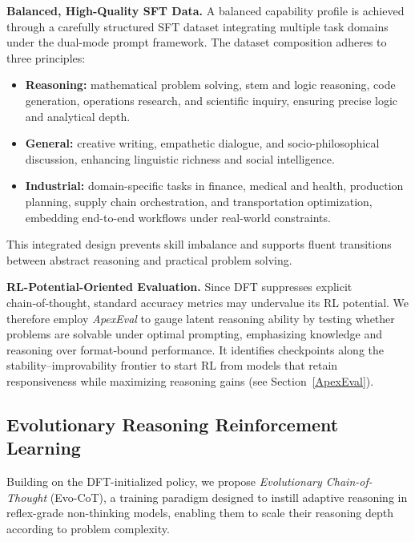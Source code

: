 \textbf{Balanced, High-Quality SFT Data.}
A balanced capability profile is achieved through a carefully structured SFT dataset integrating multiple task domains under the dual-mode prompt framework. The dataset composition adheres to three principles:
\begin{itemize}
\item \textbf{Reasoning:} mathematical problem solving, stem and logic reasoning, code generation, operations research, and scientific inquiry, ensuring precise logic and analytical depth.
\item \textbf{General:} creative writing, empathetic dialogue, and socio-philosophical discussion, enhancing linguistic richness and social intelligence.
\item \textbf{Industrial:} domain-specific tasks in finance, medical and health, production planning, supply chain orchestration, and transportation optimization, embedding end-to-end workflows under real-world constraints.
\end{itemize}
This integrated design prevents skill imbalance and supports fluent transitions between abstract reasoning and practical problem solving.

\textbf{RL-Potential-Oriented Evaluation.}
Since DFT suppresses explicit chain‑of‑thought, standard accuracy metrics may undervalue its RL potential. We therefore employ \emph{ApexEval} to gauge latent reasoning ability by testing whether problems are solvable under optimal prompting, emphasizing knowledge and reasoning over format‑bound performance. It identifies checkpoints along the stability–improvability frontier to start RL from models that retain responsiveness while maximizing reasoning gains (see Section~\ref{ApexEval}).

\subsection{Evolutionary Reasoning Reinforcement Learning}
\label{ERL}

Building on the DFT-initialized policy, we propose \emph{Evolutionary Chain-of-Thought} (Evo-CoT), a training paradigm designed to instill adaptive reasoning in reflex-grade non-thinking models, enabling them to scale their reasoning depth according to problem complexity.

